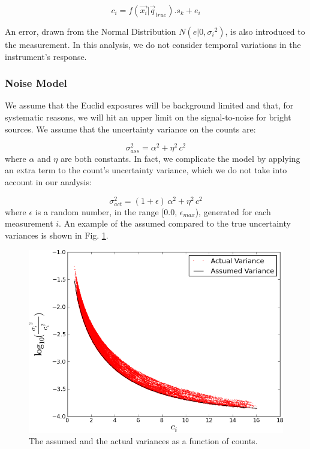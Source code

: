 \documentclass[manuscript]{aastex}
\begin{document}
\begin{displaymath}
c_i = f(\vec{x_i} | \vec{q}_{true}) . s_{k} + e_{i}
\end{displaymath}

\noindent{}An error, drawn from the Normal Distribution $N(e|0,{\sigma_i}^2)$, is also introduced to the measurement. In this analysis, we do not consider temporal variations in the instrument's response. 

\subsubsection{Noise Model}
\label{sec:noise_model}
We assume that the Euclid exposures will be background limited and that, for systematic reasons, we will hit an upper limit on the signal-to-noise for bright sources. We assume that the uncertainty variance on the counts are:

\begin{displaymath}
\sigma_{{ass}}^{2} = \alpha^{2} + \eta^{2}\, c^{2} 
\end{displaymath}
\noindent{}where $\alpha$ and $\eta$ are both constants. In fact, we complicate the model by applying an extra term to the count's uncertainty variance, which we do not take into account in our analysis: 

\begin{displaymath}
\sigma_{{act}}^{2} = (1 + \epsilon) \,\alpha^{2} + \eta^{2}\, c^{2} 
\end{displaymath}
\noindent{}where $\epsilon$ is a random number, in the range [0.0, $\epsilon_{max}$), generated for each measurement $i$. An example of the assumed compared to the true uncertainty variances is shown in Fig. \ref{fig:count_uncertainty}.

\begin{figure}[ht]
\begin{center}
\includegraphics[width=\textwidth]{invvar_plot.png}
\end{center}
\caption{The assumed and the actual variances as a function of counts.\label{fig:count_uncertainty}}
\end{figure}
\end{document}
